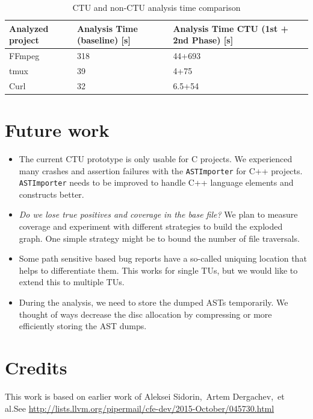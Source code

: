 \documentclass{article}
\begin{document}
\begin {table}[h!]
\centering
\begin{tabular}{| L{2cm}| C{2cm} | C{2cm} | C{2cm}|}
  \hline
  Analyzed project& Analysis Time (baseline) {\scriptsize [s]} &Analysis Time CTU (1st + 2nd Phase) {\scriptsize [s]}\\
  \hline
  \hline
  FFmpeg& 318&44+693\\
  \hline
  tmux& 39&4+75\\
  \hline
  Curl& 32&6.5+54\\
  \hline  
\end{tabular}
\caption{CTU and non-CTU analysis time comparison}
\label{tbltime}
\end{table}

\section{Future work}

\begin{itemize}
  \item The current CTU prototype is only usable for C projects.
    We experienced many crashes and assertion failures with the
    \texttt{ASTImporter} for C++ projects.
    \texttt{ASTImporter} needs to be improved to handle C++ language elements
    and constructs better.

  \item \emph{Do we lose true positives and coverage in the base file?}
    We plan to measure coverage and experiment with different strategies
    to build the exploded graph. One simple strategy might be to bound
    the number of file traversals.

  \item Some path sensitive based bug reports have a so-called uniquing location that helps
    to differentiate them. This works for single TUs, but we would like
    to extend this to multiple TUs.

  \item During the analysis, we need to store the dumped ASTs temporarily.
    We thought of ways decrease the disc allocation by compressing or
    more efficiently storing the AST dumps.
\end{itemize}

\section{Credits}
This work is based on earlier work of Aleksei Sidorin,\ Artem Dergachev,\ 
et al.\@ See \url{http://lists.llvm.org/pipermail/cfe-dev/2015-October/045730.html}
\end{document}
